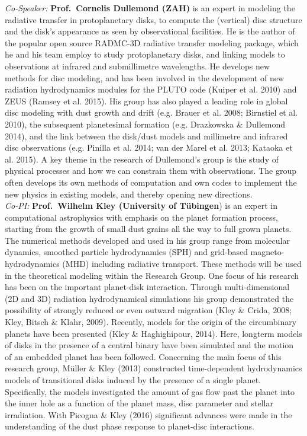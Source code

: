 \documentclass[10pt,fleqn,twoside]{article}
\begin{document}
{\it Co-Speaker:} {\bf Prof.\ Cornelis Dullemond (ZAH)} is an expert in modeling the radiative transfer in protoplanetary
disks, to compute the (vertical) disc structure and the disk's appearance as seen
by observational facilities. He is the author of the popular open source RADMC-3D 
radiative transfer modeling package, which he and his team employ to study
protoplanetary disks, and linking models to observations at infrared and submillimetre
wavelengths. He develops new methods for disc modeling, and has been involved
in the development of new radiation hydrodynamics modules for the PLUTO code
(Kuiper et al. 2010) and ZEUS (Ramsey et al. 2015). His group has also played a
leading role in global disc modeling with dust growth and drift (e.g. Brauer et al. 2008;
Birnstiel et al. 2010), the subsequent planetesimal formation (e.g. Drazkowska 
\& Dullemond 2014), and the link between the disk/dust models and millimetre
and infrared disc observations (e.g. Pinilla et al. 2014; van der Marel et al. 2013;
Kataoka et al. 2015). A key theme in the research of Dullemond's group is the study 
of physical processes and how we can constrain them with observations. The
group often develops its own methods of computation and own codes to implement
the new physics in existing models, and thereby opening new
directions. \\

{\it Co-PI:} {\bf Prof.\ Wilhelm Kley (University of T\"ubingen}) is an expert in computational astrophysics with emphasis on the
planet formation process, starting from the growth of small dust grains all the way
to full grown planets. The numerical methods developed and used in his group range 
from molecular dynamics, smoothed particle hydrodynamics (SPH) and grid-based 
magneto-hydrodynamics (MHD) including radiative transport. These methods will be used
in the theoretical modeling within the Research Group.   
One focus of his research has been on the important planet-disk
interaction. Through multi-dimensional (2D and 3D) radiation hydrodynamical simulations
his group demonstrated the possibility of strongly reduced or even outward migration
(Kley \& Crida, 2008; Kley, Bitsch \& Klahr, 2009). Recently, models for the origin of the
circumbinary planets have been presented (Kley \& Haghighipour, 2014). Here, longterm models of
disks in the presence of a central binary have been simulated and the motion of an embedded
planet has been followed. Concerning the main focus of this research group, M\"uller \& Kley
(2013) constructed time-dependent hydrodynamics models of transitional disks induced by the
presence of a single planet. Specifically, the models investigated the amount of gas flow past
the planet into the inner hole as a function of the planet mass, disc
parameter and stellar irradiation. With Picogna \& Kley (2016)
significant advances were made in the understanding of the dust phase
response to planet-disc interactions. \\
\end{document}
